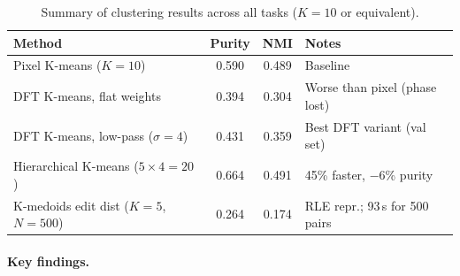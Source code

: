 \documentclass[11pt]{article}
\begin{document}
\begin{table}[H]
    \centering
    \caption{Summary of clustering results across all tasks ($K{=}10$ or equivalent).}
    \label{tab:summary}
    \begin{tabular}{lccl}
        \toprule
        Method & Purity & NMI & Notes \\
        \midrule
        Pixel K-means ($K{=}10$)         & 0.590 & 0.489 & Baseline \\
        DFT K-means, flat weights        & 0.394 & 0.304 & Worse than pixel (phase lost) \\
        DFT K-means, low-pass ($\sigma{=}4$) & 0.431 & 0.359 & Best DFT variant (val set) \\
        Hierarchical K-means ($5\!\times\!4{=}20$) & 0.664 & 0.491 & 45\% faster, $-$6\% purity \\
        K-medoids edit dist ($K{=}5$, $N{=}500$) & 0.264 & 0.174 & RLE repr.; 93\,s for 500 pairs \\
        \bottomrule
    \end{tabular}
\end{table}

\paragraph{Key findings.}
\end{document}
